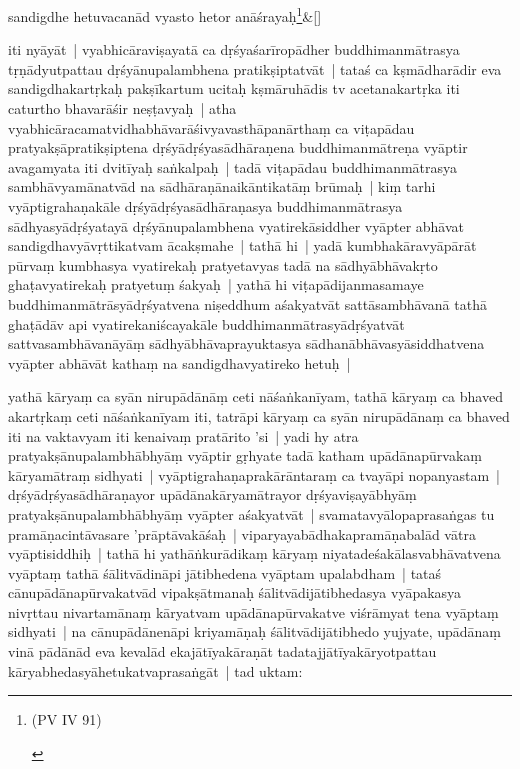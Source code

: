 \documentclass[article,12pt,a4paper]{memoir}
\newcommand{\unclear}[1]{($^{?}$#1)}
\begin{document}
	    
	    \stanza[\smallbreak]
	sandigdhe hetuvacanād vyasto hetor anāśrayaḥ\footnote{\begin{english}(PV IV 91)\end{english}}\&[\smallbreak]


	

	  \pstart iti nyāyāt | vyabhicāraviṣayatā ca dṛśyaśarīropādher buddhimanmātrasya tṛṇādyutpattau dṛśyānupalambhena pratikṣiptatvāt | tataś ca kṣmādharādir eva sandigdhakartṛkaḥ pakṣīkartum ucitaḥ kṣmāruhādis tv acetanakartṛka iti caturtho bhavarāśir neṣṭavyaḥ | atha vyabhicāracamatvidhabhāvarāśivyavasthāpanārthaṃ ca viṭapādau pratyakṣāpratikṣiptena dṛśyādṛśyasādhāraṇena buddhimanmātreṇa vyāptir avagamyata iti dvitīyaḥ saṅkalpaḥ | tadā viṭapādau buddhimanmātrasya sambhāvyamānatvād na sādhāraṇānaikāntikatāṃ brūmaḥ | kiṃ tarhi vyāptigrahaṇakāle dṛśyādṛśyasādhāraṇasya buddhimanmātrasya sādhyasyādṛśyatayā dṛśyānupalambhena vyatirekāsiddher vyāpter abhāvat sandigdhavyāvṛttikatvam ācakṣmahe | tathā hi | yadā kumbhakāravyāpārāt pūrvaṃ kumbhasya vyatirekaḥ pratyetavyas tadā na sādhyābhāvakṛto ghaṭavyatirekaḥ pratyetuṃ śakyaḥ | yathā hi viṭapādijanmasamaye buddhimanmātrāsyādṛśyatvena niṣeddhum aśakyatvāt sattāsambhāvanā tathā ghaṭādāv api vyatirekaniścayakāle buddhimanmātrasyādṛśyatvāt sattvasambhāvanāyāṃ sādhyābhāvaprayuktasya sādhanābhāvasyāsiddhatvena vyāpter abhāvāt kathaṃ na sandigdhavyatireko hetuḥ |
	\pend
      

	  \pstart {} yathā kāryaṃ ca syān nirupādānāṃ ceti nāśaṅkanīyam, tathā kāryaṃ ca bhaved akartṛkaṃ ceti nāśaṅkanīyam iti, tatrāpi kāryaṃ ca syān nirupādānaṃ ca bhaved iti na vaktavyam iti kenaivaṃ pratārito 'si | yadi hy atra pratyakṣānupalambhābhyāṃ vyāptir gṛhyate tadā katham upādānapūrvakaṃ kāryamātraṃ sidhyati | vyāptigrahaṇaprakārāntaraṃ ca tvayāpi nopanyastam | dṛśyādṛśyasādhāraṇayor upādānakāryamātrayor dṛśyaviṣayābhyāṃ pratyakṣānupalambhābhyāṃ vyāpter \edtext{abhyūhitum}{\Afootnote{ \cite{thakur75} \unclear{angra}hītum \cite{RNAms} }} aśakyatvāt | svamatavyālopaprasaṅgas tu pramāṇacintāvasare 'prāptāvakāśaḥ | viparyayabādhakapramāṇabalād vātra vyāptisiddhiḥ | tathā hi yathāṅkurādikaṃ kāryaṃ niyatadeśakālasvabhāvatvena vyāptaṃ tathā śālitvādināpi jātibhedena vyāptam upalabdham | tataś cānupādānapūrvakatvād vipakṣātmanaḥ śālitvādijātibhedasya vyāpakasya nivṛttau nivartamānaṃ kāryatvam upādānapūrvakatve viśrāmyat tena vyāptaṃ sidhyati | na cānupādānenāpi kriyamāṇaḥ śālitvādijātibhedo yujyate, upādānaṃ vinā pādānād eva kevalād ekajātīyakāraṇāt tadatajjātīyakāryotpattau kāryabhedasyāhetukatvaprasaṅgāt | tad uktam: 
	    \pend
	  
\end{document}
